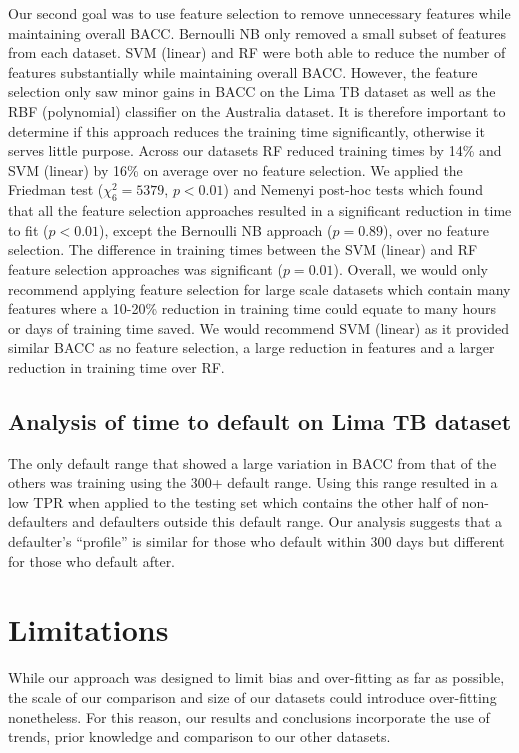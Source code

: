\documentclass{sig-alternate-05-2015}
\begin{document}
	Our second goal was to use feature selection to remove unnecessary features while maintaining overall BACC. Bernoulli NB only removed a small subset of features from each dataset. SVM (linear) and RF were both able to reduce the number of features substantially while maintaining overall BACC. However, the feature selection only saw minor gains in BACC on the Lima TB dataset as well as the RBF (polynomial) classifier on the Australia dataset. It is therefore important to determine if this approach reduces the training time significantly, otherwise it serves little purpose. Across our datasets RF reduced training times by 14\% and SVM (linear) by 16\% on average over no feature selection. We applied the Friedman test ($\chi^2_{6}=5379$, $p<0.01$) and Nemenyi post-hoc tests which found that all the feature selection approaches resulted in a significant reduction in time to fit ($p<0.01$), except the Bernoulli NB approach ($p=0.89$), over no feature selection. The difference in training times between the SVM (linear) and RF feature selection approaches was significant ($p=0.01$). Overall, we would only recommend applying feature selection for large scale datasets which contain many features where a 10-20\% reduction in training time could equate to many hours or days of training time saved. We would recommend SVM (linear) as it provided similar BACC as no feature selection, a large reduction in features and a larger reduction in training time over RF.

	
	\subsection{Analysis of time to default on Lima TB dataset}
	The only default range that showed a large variation in BACC from that of the others was training using the 300+ default range. Using this range resulted in a low TPR when applied to the testing set which contains the other half of non-defaulters and defaulters outside this default range. Our analysis suggests that a defaulter's ``profile'' is similar for those who default within 300 days but different for those who default after.	
	
	\section{ Limitations}
	\label{sec:limitations}
	While our approach was designed to limit bias and over-fitting as far as possible, the scale of our comparison and size of our datasets could introduce over-fitting nonetheless. For this reason, our results and conclusions incorporate the use of trends, prior knowledge and comparison to our other datasets. 
	
\end{document}

